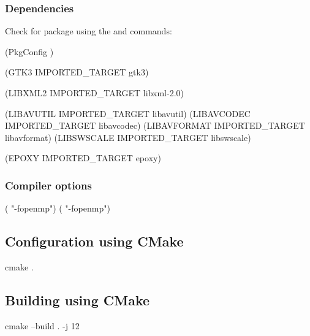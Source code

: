 \subsubsection*{Dependencies}
\label{cmake_deps}

Check for package using the  and  commands: 
\begin{script}
 (PkgConfig )

 (GTK3  IMPORTED_TARGET gtk3)

 (LIBXML2  IMPORTED_TARGET libxml-2.0)

 (LIBAVUTIL  IMPORTED_TARGET libavutil)
 (LIBAVCODEC  IMPORTED_TARGET libavcodec)
 (LIBAVFORMAT  IMPORTED_TARGET libavformat)
 (LIBSWSCALE  IMPORTED_TARGET libswscale)

 (EPOXY  IMPORTED_TARGET epoxy)
\end{script}

\subsubsection*{Compiler options}

\begin{script}
 ( "-fopenmp")
 ( "-fopenmp")
\end{script}


\subsection{Configuration using CMake}

\begin{script}
 cmake .
\end{script}

\subsection{Building using CMake}

\begin{script}
 cmake --build . -j 12
\end{script}

